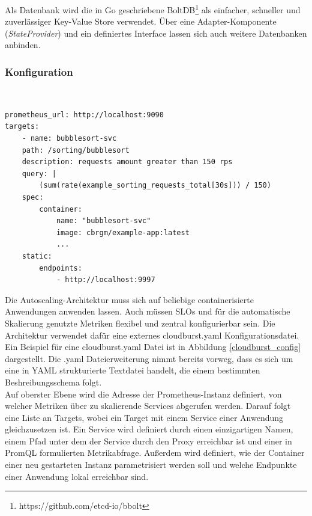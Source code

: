 \documentclass[runningheads]{llncs}
\begin{document}
Als Datenbank wird die in Go geschriebene BoltDB\footnote{https://github.com/etcd-io/bbolt} als einfacher, schneller und zuverlässiger Key-Value Store verwendet. Über eine Adapter-Komponente (\textit{StateProvider}) und ein definiertes Interface lassen sich auch weitere Datenbanken anbinden.

\subsubsection{Konfiguration} \label{configuration} \hfill\\

\begin{lstlisting}[label={cloudburst_config}, caption={Ein Beispiel für eine \textbf{cloudburst.yaml} Datei. Definiert wird ein Service mit einer Abfrage formuliert in PromQL, einer Angabe der Parameter für zu startende Container-Instanzen (\textit{spec}) und eine Liste von lokal erreichbaren Endpunkten (\textit{static})},captionpos=b]
prometheus_url: http://localhost:9090
targets:
	- name: bubblesort-svc
	path: /sorting/bubblesort
	description: requests amount greater than 150 rps
	query: |
		(sum(rate(example_sorting_requests_total[30s])) / 150)
	spec:
		container:
			name: "bubblesort-svc"
			image: cbrgm/example-app:latest
			...
	static:
		endpoints:
			- http://localhost:9997
\end{lstlisting}

Die Autoscaling-Architektur muss sich auf beliebige containerisierte Anwendungen anwenden lassen. Auch müssen SLOs und für die automatische Skalierung genutzte Metriken flexibel und zentral konfigurierbar sein. Die Architektur verwendet dafür eine externes cloudburst.yaml Konfigurationsdatei. Ein Beispiel für eine cloudburst.yaml Datei ist in Abbildung \ref{cloudburst_config} dargestellt. Die .yaml Dateierweiterung nimmt bereits vorweg, dass es sich um eine in YAML strukturierte Textdatei handelt, die einem bestimmten Beshreibungsschema folgt. \\

Auf oberster Ebene wird die Adresse der Prometheus-Instanz definiert, von welcher Metriken über zu skalierende Services abgerufen werden. Darauf folgt eine Liste an Targets, wobei ein Target mit einem Service einer Anwendung gleichzusetzen ist. Ein Service wird definiert durch einen einzigartigen Namen, einem Pfad unter dem der Service durch den Proxy erreichbar ist und einer in PromQL formulierten Metrikabfrage. Außerdem wird definiert, wie der Container einer neu gestarteten Instanz parametrisiert werden soll und welche Endpunkte einer Anwendung lokal erreichbar sind.
\end{document}
